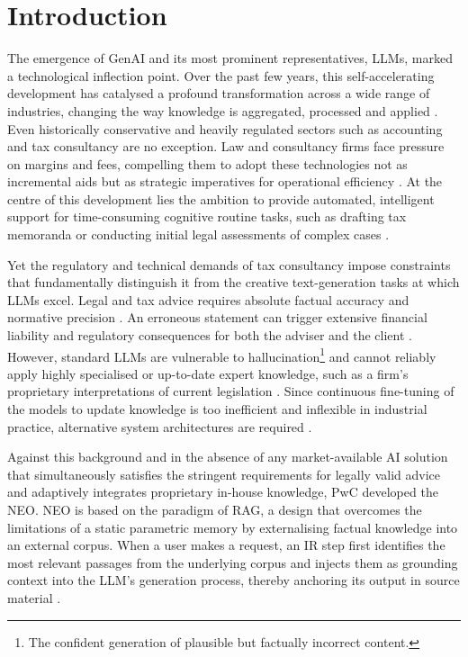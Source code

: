 \chapter{Introduction}
\label{chp:intro}

The emergence of \ac{GenAI} and its most prominent representatives, \acp{LLM}, marked a technological inflection point. Over the past few years, this self-accelerating development has catalysed a profound transformation across a wide range of industries, changing the way knowledge is aggregated, processed and applied \cite{zhao2026surveylargelanguagemodels}. Even historically conservative and heavily regulated sectors such as accounting and tax consultancy are no exception. Law and consultancy firms face pressure on margins and fees, compelling them to adopt these technologies not as incremental aids but as strategic imperatives for operational efficiency \cite{mckinsey_genai_2023}. At the centre of this development lies the ambition to provide automated, intelligent support for time-consuming cognitive routine tasks, such as drafting tax memoranda or conducting initial legal assessments of complex cases \cite{lastres2015rebooting,waltl2018semantic,wind2026steuerllm}.

Yet the regulatory and technical demands of tax consultancy impose constraints that fundamentally distinguish it from the creative text-generation tasks at which \acp{LLM} excel. Legal and tax advice requires absolute factual accuracy and normative precision \cite{Larenz1995_Methodenlehre}. An erroneous statement can trigger extensive financial liability and regulatory consequences for both the adviser and the client \cite{Birk2023_Steuerrecht}. However, standard \acp{LLM} are vulnerable to hallucination\footnote{The confident generation of plausible but factually incorrect content.} and cannot reliably apply highly specialised or up-to-date expert knowledge, such as a firm's proprietary interpretations of current legislation \cite{Ji_2023_hallucination, zhao2026surveylargelanguagemodels}. Since continuous fine-tuning of the models to update knowledge is too inefficient and inflexible in industrial practice, alternative system architectures are required \cite{petroni_2019_language,barnett2024seven,lewis_rag_2020,zhao2026surveylargelanguagemodels}.

Against this background and in the absence of any market-available \ac{AI} solution that simultaneously satisfies the stringent requirements for legally valid advice and adaptively integrates proprietary in-house knowledge, \ac{PwC} developed the \acf{NEO}. \ac{NEO} is based on the paradigm of \acf{RAG}, a design that overcomes the limitations of a static parametric memory by externalising factual knowledge into an external corpus.  When a user makes a request, an \ac{IR} step first identifies the most relevant passages from the underlying corpus and injects them as grounding context into the \ac{LLM}'s generation process, thereby anchoring its output in source material \cite{lewis_rag_2020}.

